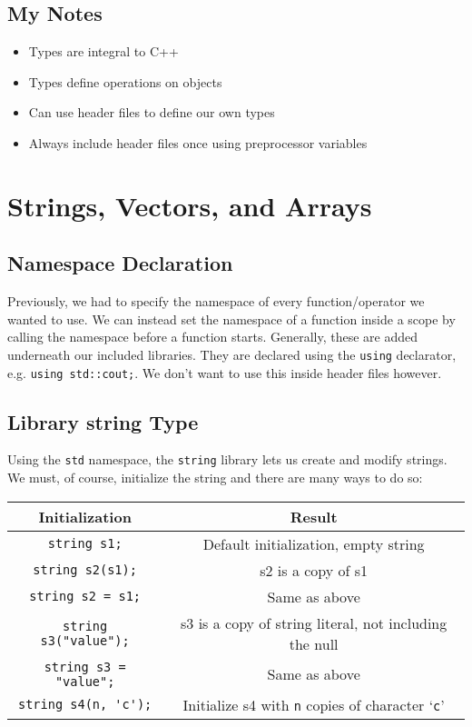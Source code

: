\documentclass[12pt, a4paper]{report}
\begin{document}
\section{My Notes}
\begin{itemize}
	\item Types are integral to C++
	\item Types define operations on objects
	\item Can use header files to define our own types
	\item Always include header files once using preprocessor variables
\end{itemize}

\chapter{Strings, Vectors, and Arrays}
\section{Namespace Declaration}
Previously, we had to specify the namespace of every function/operator we wanted to use. We can instead set the namespace of a function inside a scope by calling the namespace before a function starts. Generally, these are added underneath our included libraries. They are declared using the \verb|using| declarator,
e.g. \verb|using std::cout;|. We don't want to use this inside header files however.

\section{Library string Type}
Using the \verb|std| namespace, the \verb|string| library lets us create and modify strings. We must, of course, initialize the string and there are many ways to do so:
\begin{center}
	\begin{tabular}{ |c|c| }
		\hline
		\textbf{Initialization} & \textbf{Result} \\
		\hline
		\verb|string s1;| & Default initialization, empty string \\
		\hline
		\verb|string s2(s1);| & s2 is a copy of s1 \\
		\hline
		\verb|string s2 = s1;| & Same as above \\
		\hline
		\verb|string s3("value");| & s3 is a copy of string literal, not including the null \\
		\hline
		\verb|string s3 = "value";| & Same as above \\
		\hline
		\verb|string s4(n, 'c');| & Initialize s4 with \verb|n| copies of character `\verb|c|' \\
		\hline
	\end{tabular}
\end{center}
\end{document}
